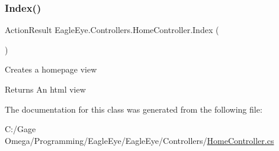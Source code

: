 \subsubsection{\texorpdfstring{Index()}{Index()}}
{\footnotesize\ttfamily Action\+Result Eagle\+Eye.\+Controllers.\+Home\+Controller.\+Index (\begin{DoxyParamCaption}{ }\end{DoxyParamCaption})}



Creates a homepage view 

\begin{DoxyReturn}{Returns}
An html view
\end{DoxyReturn}


The documentation for this class was generated from the following file\+:\begin{DoxyCompactItemize}
\item 
C\+:/\+Gage Omega/\+Programming/\+Eagle\+Eye/\+Eagle\+Eye/\+Controllers/\mbox{\hyperlink{_home_controller_8cs}{Home\+Controller.\+cs}}\end{DoxyCompactItemize}
